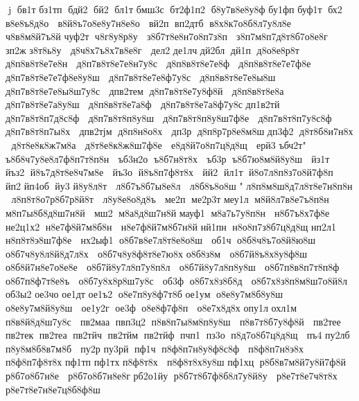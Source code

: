j ﻿ бв1т 
 бз1тп  бдй2  бй2  бл1т 
 бмш3с  бт2ф1п2  б8у7в8е8у8ф  
 бу1фп 
 буф1т  бх2  в8е8ъ8д8о   в8й8ъ7о8е8у7н8е8о   вй2п  вп2дтб  в8х8к7о8б8л7у8л8е   ч8в8м8й7ъ8й  %
 чуф2т  ч8г8у8р8у   з8б7т8е8н7о8п7з8п   з8п7м8п7д8т8б7о8е8г   зп2ж 
 з8т8ь8у   д8ч8х7ъ8х7в8е8г   дел2 
 де1лч 
 дй2бл  дй1п  д8о8е8р8т   д8п8в8т8е7е8н   д8п7в8т8е7е8н7у8с   д8п8в8т8е7е8ф   д8п8в8т8е7е7ф8е   д8п7в8т8е7е7ф8е8у8ш   д8п7в8т8е7е8ф7у8с   д8п8в8т8е7е8ы8ш   д8п7в8т8е7е8ы8ш7у8с   дпв2тем  д8п7в8т8е7у8ф8й   д8п8в8т8е8а   д8п7в8т8е7а8у8ш   д8п8в8т8е7а8ф   д8п7в8т8е7а8ф7у8с  
 дп1в2тй  д8п7в8т8п7д8с8ф   д8п7в8т8п8у8ш   д8п7в8т8п8у8ш7ф8е   д8п7в8т8п7у8с8ф   д8п7в8т8п7ы8х   дпв2тјм  д8п8н8о8х   дп3р  д8п8р7р8е8м8ш  	 дп3ф2  д8т8б8и7н8х   д8т8е8к8ж7м8а   д8т8е8к8ж8ш7ф8е   е8д8й7о8п7ц8д8щ   ерй3 
 ъбч2т " ъ8б8ч7у8е8л7ф8п7т8п8н   ъб3н2о  ъ8б7н8т8х   ъб3р  ъ8б7ю8м8й8у8ш   йз1т  йъз2  й8ъ7д8т8е8ч7м8е   йъ3о  й8ъ8п7ф8т8х   йй2  йл1т  й8о7л8п8з7о8й7ф8п   йп2 
 йп4об  йу3 
 й8у8л8т   л8б7ъ8б7ы8е8л   л8б8ъ8о8ш  " л8п8м8ш8д7л8т8е7н8п8н   л8п8т8о7р8б7р8й8т   л8у8е8о8д8ъ   ме2п  ме2р3т 
 меу1л  м8й8л7в8е7ъ8п8н   м8п7ы8б8д8ш7н8й   мш2  м8а8д8ш7н8й  
 мауф1  м8а7ь7у8п8н   н8б7ъ8х7ф8е   не2ц1х2  н8е7ф8й7м8б8н   н8е7ф8й7м8б7н8й  
 нй1пн  н8о8п7з8б7ц8д8щ  	 нп2л1  н8п8т8э8ш7ф8е   нх2ыф1  о8б7в8е7л8т8е8о8ш   об1ч  о8б8ч8ъ7о8й8ю8ш   о8б7ч8у8л8й8д7л8х   о8б7ч8у8ф8т8е7ю8х  
 о8б8з8м   о8б7й8ъ8х8у8ф8ш   о8б8й7н8е7о8е8е   о8б7й8у7л8п7у8п8л   о8б7й8у7л8п8у8ш   о8б7п8в8п7т8п8ф   о8б7п8ф7т8е8ъ   о8б7у8х8р8ш7у8с   об3ф  о8б7х8з8б8д   о8б7х8з8п8м8ш7о8й8л  	 об3ы2 
 ое3чо 
 ое1дт 	 ое1ъ2  о8е7п8у8ф7т8б  
 ое1ум  о8е8у7м8б8у8ш   о8е8у7м8й8у8ш   ое1у2г  ое3ф  о8е8ф7ф8п   о8е7х8д8х  
 опу1л 
 охл1м  п8в8й8д8ш7у8с   пв2маа  пвп3ц2  п8в8п7ы8м8п8у8ш   п8в7т8б7у8ф8й   пв2тее  пв2тек  пв2теа  пв2тйч  пв2тйм  пв2тйф  пчп1  пз3о  п8д7о8б7ц8д8щ   пъ4 
 пу2лб  п8у8м8б8в7м8б   пу2р 
 пу3рй  пф1ч  п8ф8п7н8у8ф8с8ф   п8ф8п7н8э8х   п8ф8п7ф8т8х  
 пф1тп 
 пф1тх 
 п8ф8т8х   п8ф8т8х8у8ш  
 пф1хц  р8б8в7м8й7у8й7ф8й   р8б7о8б7н8е   р8б7о8б7н8е8г  
 рб2о1йу  р8б7т8б7ф8б8л7у8й8у   р8е7т8е7ч8т8х   р8е7т8е7н8е7ц8б8ф8ш  %
